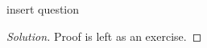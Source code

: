 \begin{solution}{2.3}
    \begin{question}[]
        insert question    
    \end{question}
    \tcblower{}
    \begin{proof}[Solution]
        Proof is left as an exercise.
    \end{proof}
\end{solution}
